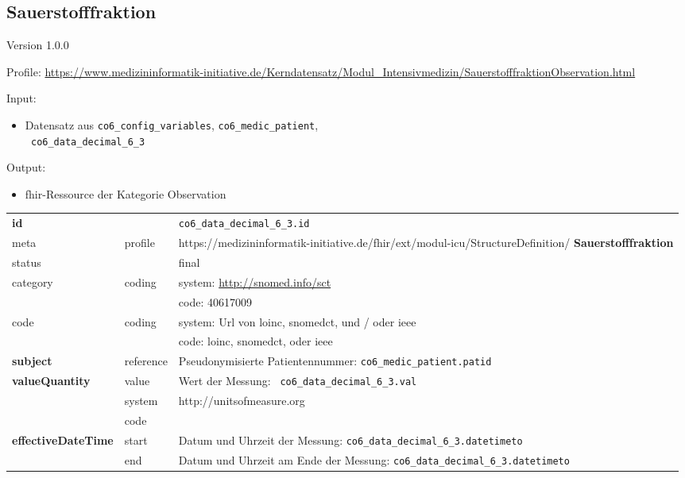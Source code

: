 \subsection{Sauerstofffraktion} 
\noindent Version 1.0.0

\noindent Profile: \url{https://www.medizininformatik-initiative.de/Kerndatensatz/Modul_Intensivmedizin/SauerstofffraktionObservation.html}

\noindent Input:
\begin{itemize}
	\item Datensatz aus \texttt{co6\_config\_variables}, \texttt{co6\_medic\_patient}, \\ \texttt{
co6\_data\_decimal\_6\_3}
\end{itemize}
Output:
\begin{itemize}
        \item \ac{fhir}-Ressource der Kategorie \glqq Observation\grqq{}
\end{itemize}
\begin{longtable}{|l|l|p{7.5cm}|}
        \hline
        \rowcolor{lightgray} \multicolumn{3}{|l|}{Data Mapping (inhaltlich)} \\ \hline
        \textbf{id} &  & \texttt{co6\_data\_decimal\_6\_3.id} \\ \hline
	meta & profile & https://medizininformatik-initiative.de/fhir/ext/modul-icu/StructureDefinition/\textbf{
Sauerstofffraktion} \\ \hline 
	status &  & final   \\ \hline 
	category & coding & system: \url{http://snomed.info/sct} \\
\cline{3-3}
	& & code: 40617009 \\ \hline
	code & coding & system: Url von \ac{loinc}, \ac{snomedct}, und / oder \ac{ieee} \\ 
	\cline{3-3} 
	 &  & code: \ac{loinc}, \ac{snomedct}, oder \ac{ieee} \\ \hline
	 \textbf{subject}  & reference & Pseudonymisierte Patientennummer: \texttt{co6\_medic\_patient.patid} \\ \hline
	 \textbf{valueQuantity}  & value & Wert der Messung: \texttt{
co6\_data\_decimal\_6\_3.val} \\
        \cline{2-3}
         & system & http://unitsofmeasure.org \\
         \cline{2-3}
         & code & \\ \hline
     \textbf{effectiveDateTime}  & start & Datum und Uhrzeit der Messung: \texttt{co6\_data\_decimal\_6\_3.datetimeto} \\
    \cline{2-3}
     & end & Datum und Uhrzeit am Ende der Messung: \texttt{co6\_data\_decimal\_6\_3.datetimeto} \\ \hline
\end{longtable}


